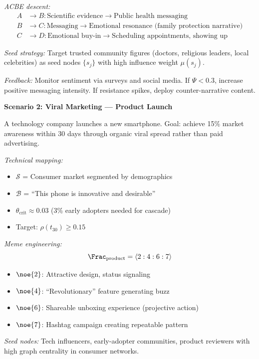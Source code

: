 \begin{tcolorbox}[colback=yellow!5!white,colframe=yellow!65!black,title=\textbf{Real-Life Scenarios: Social Engineering Applications},breakable]
\textit{ACBE descent:}
\begin{align*}
    A &\to B: \text{Scientific evidence} \to \text{Public health messaging} \\
    B &\to C: \text{Messaging} \to \text{Emotional resonance (family protection narrative)} \\
    C &\to D: \text{Emotional buy-in} \to \text{Scheduling appointments, showing up}
\end{align*}

\textit{Seed strategy:} Target trusted community figures (doctors, religious leaders, local celebrities) as seed nodes $\{s_j\}$ with high influence weight $\mu(s_j)$.

\textit{Feedback:} Monitor sentiment via surveys and social media. If $\Psi < 0.3$, increase positive messaging intensity. If resistance spikes, deploy counter-narrative content.

\medskip

\textbf{Scenario 2: Viral Marketing --- Product Launch}

A technology company launches a new smartphone. Goal: achieve 15\% market awareness within 30 days through organic viral spread rather than paid advertising.

\textit{Technical mapping:}
\begin{itemize}
    \item $\mathcal{S}$ = Consumer market segmented by demographics
    \item $\mathcal{B}$ = ``This phone is innovative and desirable''
    \item $\theta_{\mathrm{crit}} \approx 0.03$ (3\% early adopters needed for cascade)
    \item Target: $\rho(t_{30}) \geq 0.15$
\end{itemize}

\textit{Meme engineering:}
\[
    \Frac_{\mathrm{product}} = \langle 2:4:6:7 \rangle
\]
\begin{itemize}
    \item $\noe{2}$: Attractive design, status signaling
    \item $\noe{4}$: ``Revolutionary'' feature generating buzz
    \item $\noe{6}$: Shareable unboxing experience (projective action)
    \item $\noe{7}$: Hashtag campaign creating repeatable pattern
\end{itemize}

\textit{Seed nodes:} Tech influencers, early-adopter communities, product reviewers with high graph centrality in consumer networks.


\end{tcolorbox}
